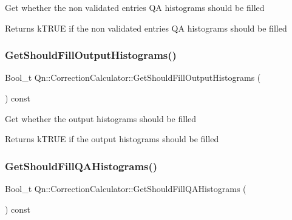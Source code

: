 Get whether the non validated entries QA histograms should be filled \begin{DoxyReturn}{Returns}
k\+T\+R\+UE if the non validated entries QA histograms should be filled 
\end{DoxyReturn}
\mbox{\label{classQn_1_1CorrectionCalculator_a1c3dca90ca901753f71f95cfea0473de}} 
\subsubsection{\texorpdfstring{Get\+Should\+Fill\+Output\+Histograms()}{GetShouldFillOutputHistograms()}}
{\footnotesize\ttfamily Bool\+\_\+t Qn\+::\+Correction\+Calculator\+::\+Get\+Should\+Fill\+Output\+Histograms (\begin{DoxyParamCaption}{ }\end{DoxyParamCaption}) const\hspace{0.3cm}{\ttfamily [inline]}}

Get whether the output histograms should be filled \begin{DoxyReturn}{Returns}
k\+T\+R\+UE if the output histograms should be filled 
\end{DoxyReturn}
\mbox{\label{classQn_1_1CorrectionCalculator_a9ccaff2f7d4e3b7d5f7badfc6e904b91}} 
\subsubsection{\texorpdfstring{Get\+Should\+Fill\+Q\+A\+Histograms()}{GetShouldFillQAHistograms()}}
{\footnotesize\ttfamily Bool\+\_\+t Qn\+::\+Correction\+Calculator\+::\+Get\+Should\+Fill\+Q\+A\+Histograms (\begin{DoxyParamCaption}{ }\end{DoxyParamCaption}) const\hspace{0.3cm}{\ttfamily [inline]}}

